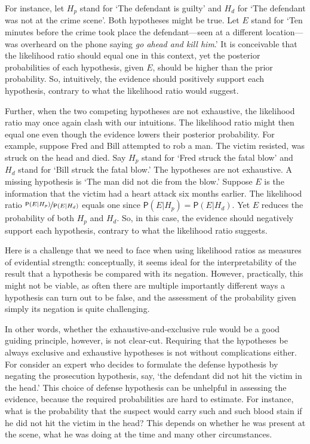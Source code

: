 \documentclass[
  10pt,
  dvipsnames,enabledeprecatedfontcommands]{scrartcl}
\newcommand{\mar}[1]{\todo[color=blue!40]{#1}}
\newcommand{\pr}[1]{\mathsf{P}(#1)}
\begin{document}
For instance, let \(H_p\) stand for `The defendant is guilty' and
\(H_d\) for `The defendant was not at the crime scene'. Both hypotheses
might be true. Let \(E\) stand for `Ten minutes before the crime took
place the defendant---seen at a different location--- was overheard on
the phone saying \emph{go ahead and kill him}.' It is conceivable that
the likelihood ratio should equal one in this context, yet the posterior
probabilities of each hypothesis, given \(E\), should be higher than the
prior probability. So, intuitively, the evidence should positively
support each hypothesis, contrary to what the likelihood ratio would
suggest.

Further, when the two competing hypotheses are not exhaustive, the
likelihood ratio may once again clash with our intuitions. The
likelihood ratio might then equal one even though the evidence lowers
their posterior probability. For example, suppose Fred and Bill
attempted to rob a man. The victim resisted, was struck on the head and
died. Say \(H_p\) stand for `Fred struck the fatal blow' and \(H_d\)
stand for `Bill struck the fatal blow.' The hypotheses are not
exhaustive. A missing hypothesis is `The man did not die from the blow.'
Suppose \(E\) is the information that the victim had a heart attack six
months earlier. The likelihood ratio
\(\nicefrac{\pr{E \vert H_p}}{\pr{E \vert H_d}}\) equals one since
\(\pr{E\vert H_p}=\pr{E\vert H_d}\). Yet \(E\) reduces the probability
of both \(H_p\) and \(H_d\). So, in this case, the evidence should
negatively support each hypothesis, contrary to what the likelihood
ratio suggests.

\mar{R: added this passage in light of Sophie's comments}

Here is a challenge that we need to face when using likelihood ratios as
measures of evidential strength: conceptually, it seems ideal for the
interpretability of the result that a hypothesis be compared with its
negation. However, practically, this might not be viable, as often there
are multiple importantly different ways a hypothesis can turn out to be
false, and the assessment of the probability given simply its negation
is quite challenging.

In other words, whether the exhaustive-and-exclusive rule would be a
good guiding principle, however, is not clear-cut. Requiring that the
hypotheses be always exclusive and exhaustive hypotheses is not without
complications either. For consider an expert who decides to formulate
the defense hypothesis by negating the prosecution hypothesis, say, `the
defendant did not hit the victim in the head.' This choice of defense
hypothesis can be unhelpful in assessing the evidence, because the
required probabilities are hard to estimate. For instance, what is the
probability that the suspect would carry such and such blood stain if he
did not hit the victim in the head? This depends on whether he was
present at the scene, what he was doing at the time and many other
circumstances.
\end{document}
